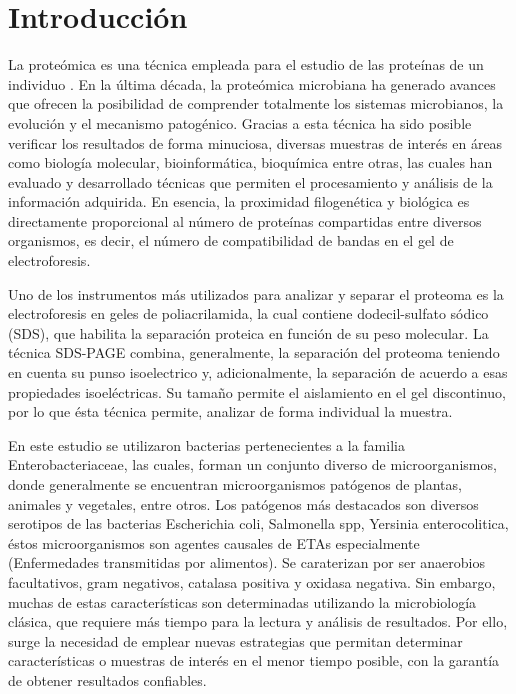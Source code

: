 \documentclass[%
 reprint,
 amsmath,amssymb,
 aps,
showkeys,
letter,
12pts
]{revtex4-1}
\begin{document}
\maketitle


\section{\label{sec:Intro}Introducción}
	La proteómica es una técnica empleada para el estudio de las proteínas de un individuo \cite{intro1}. En la última década, la proteómica microbiana ha generado avances que ofrecen la  posibilidad de comprender totalmente los sistemas microbianos, la evolución y el mecanismo patogénico\cite{intro1}. Gracias a esta técnica ha sido posible verificar los resultados de forma minuciosa, diversas muestras de interés en áreas como biología molecular, bioinformática, bioquímica entre otras, las cuales han evaluado y desarrollado técnicas que permiten el procesamiento y análisis de la información adquirida. En esencia, la proximidad filogenética y biológica es directamente proporcional al número de proteínas compartidas entre diversos organismos, es decir, el número de compatibilidad de bandas en el gel de electroforesis.
	
	Uno de los instrumentos más utilizados para analizar y separar el proteoma es la electroforesis en geles de poliacrilamida, la cual contiene dodecil-sulfato sódico (SDS), que habilita la separación proteica en función de su peso molecular. La técnica SDS-PAGE combina, generalmente, la separación del proteoma teniendo en cuenta su punso isoelectrico y, adicionalmente, la separación de acuerdo a  esas propiedades isoeléctricas. Su tamaño permite el aislamiento en el gel discontinuo, por lo que ésta técnica permite, analizar de forma individual la muestra.
	
	En este estudio se utilizaron  bacterias pertenecientes a la familia Enterobacteriaceae, las cuales, forman un conjunto diverso de microorganismos, donde generalmente se encuentran microorganismos patógenos de plantas, animales y vegetales, entre otros. Los patógenos más destacados son diversos serotipos de las bacterias Escherichia coli, Salmonella spp, Yersinia enterocolitica, éstos microorganismos son agentes causales de ETAs especialmente (Enfermedades transmitidas por alimentos). Se caraterizan por ser anaerobios facultativos, gram negativos, catalasa positiva y oxidasa negativa\cite{intro2}. Sin embargo, muchas de estas características son determinadas utilizando la microbiología clásica, que requiere más tiempo para la lectura y análisis de resultados. Por ello, surge la necesidad de emplear nuevas estrategias que permitan determinar características o muestras de interés en el menor tiempo posible, con la garantía de obtener resultados confiables.
	
\end{document}
